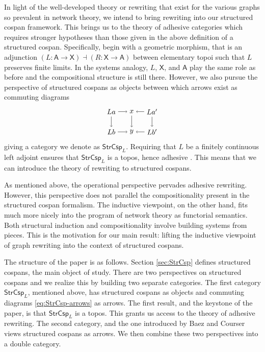 \documentclass{amsart}
\newcommand{\A}{\cat{A}}
\newcommand{\X}{\cat{X}}
\newcommand{\StrCsp}{\cat{StrCsp}}
\newcommand{\cat}[1]{\mathsf{#1}}
\newcommand{\from}{\colon}
\theoremstyle{remark}
\theoremstyle{definition}
\begin{document}
In light of the well-developed theory or rewriting that exist for the
various graphs so prevalent in network theory, we intend to bring
rewriting into our structured cospan framework.  This brings us to the
theory of adhesive categories which requires stronger hypotheses
than those given in the above definition of a structured
cospan. Specifically, begin with a geometric morphism, that is an
adjunction $ ( L \from \A \to \X ) \dashv ( R \from \X \to \A ) $
between elementary topoi such that $ L $ preserves finite limits. In
the systems analogy, $ L $, $ \X $, and $ \A $ play the same role as
before and the compositional structure is still there.  However, we
also pursue the perspective of structured cospans as objects between
which arrows exist as commuting diagrams
%
\begin{equation} \label{eq:StrCsp-arrows}
  \begin{tikzpicture}
    \node (1t) at (0,1) {$ La $};
    \node (2t) at (1,1) {$ x $};
    \node (3t) at (2,1) {$ La' $};
    \node (1b) at (0,0) {$ Lb $};
    \node (2b) at (1,0) {$ y $};
    \node (3b) at (2,0) {$ Lb' $};
    \draw [->] (1t) to node [] {\scriptsize{$  $}} (2t);
    \draw [->] (3t) to node [] {\scriptsize{$  $}} (2t);
    \draw [->] (1b) to node [] {\scriptsize{$  $}} (2b);
    \draw [->] (3b) to node [] {\scriptsize{$  $}} (2b);
    \draw [->] (1t) to node [] {\scriptsize{$  $}} (1b);
    \draw [->] (2t) to node [] {\scriptsize{$  $}} (2b);
    \draw [->] (3t) to node [] {\scriptsize{$  $}} (3b);
  \end{tikzpicture}
\end{equation}
%
giving a category we denote as $ \StrCsp_L $.  Requiring that $ L $ be
a finitely continuous left adjoint ensures that $ \StrCsp_L $ is a
topos, hence adhesive \cite{LackSobo_ToposIsAdh}. This means that we
can introduce the theory of rewriting to structured cospans.

As mentioned above, the operational perspective pervades adhesive
rewriting. However, this perspective does not parallel the
compositionality present in the structured cospan formalism. The
inductive viewpoint, on the other hand, fits much more nicely into the
program of network theory as functorial semantics. Both structural
induction and compositionality involve building systems from
pieces. This is the motivation for our main result: lifting the
inductive viewpoint of graph rewriting into the context of structured
cospans.

The structure of the paper is as follows.  Section \ref{sec:StrCsp}
defines structured cospans, the main object of study. There are two
perspectives on structured cospans and we realize this by building two
separate categories.  The first category $ \StrCsp_L $, mentioned
above, has structured cospans as objects and commuting diagrams
\eqref{eq:StrCsp-arrows} as arrows. The first result, and the keystone
of the paper, is that $ \StrCsp_L $ is a topos.  This grants us access
to the theory of adhesive rewriting.  The second category, and the one
introduced by Baez and Courser \cite{StrCsp} views structured cospans
as arrows.  We then combine these two perspectives into a double
category.
\end{document}
